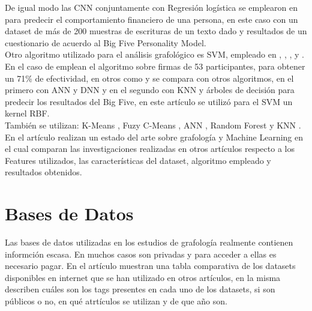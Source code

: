 \documentclass[10pt, a4paper]{article}
\begin{document}
        De igual modo las CNN conjuntamente con Regresi\'on log\'istica se emplearon en \cite{THOMAS2020100315} para predecir el comportamiento financiero de una persona, en este caso con un dataset de más de 200 muestras de escrituras de un texto dado y resultados de un cuestionario de acuerdo al Big Five Personality Model.\\ 

        Otro algoritmo utilizado para el an\'alisis grafol\'ogico es SVM, empleado en \cite{CHITLANGIA2019384}, \cite{shete2019graphologist}, \cite{maliki2020personality}, \cite{hashemi2015graphology} y \cite{kurniawan2023framework}. En el caso de \cite{maliki2020personality} emplean el algoritmo sobre firmas de 53 participantes, para obtener un 71\% de efectividad, 
        en otros como \cite{shete2019graphologist} y \cite{kurniawan2023framework} se compara con otros algoritmos, en el primero con ANN y DNN y en el segundo con KNN y \'arboles de decisi\'on para predecir los resultados del Big Five, en este art\'iculo se utiliz\'o para el SVM un kernel RBF.\\ 

        Tambi\'en se utilizan: K-Means \cite{pathak2020personality}, Fuzy C-Means \cite{pratiwi2016personality}, ANN \cite{lokhande2017analysis,shete2019graphologist,champa2010artificial,pathak2020personality}, Random Forest \cite{likforman2017emothaw, ayzeren2019emotional} y KNN \cite{pathak2020personality,kurniawan2023framework}.\\

        En el art\'iculo \cite{remaida2020handwriting} realizan un estado del arte sobre grafolog\'ia y Machine Learning en el cual comparan las investigaciones realizadas en 
        otros art\'iculos respecto a los Features utilizados, las caracter\'isticas del dataset, algoritmo empleado y resultados obtenidos.

    \section{Bases de Datos}

        Las bases de datos utilizadas en los estudios de grafolog\'ia realmente contienen informci\'on escasa. En muchos casos 
        son privadas y para acceder a ellas es necesario pagar. En el art\'iculo \cite{likforman2017emothaw} muestran una tabla comparativa de los datasets disponibles en 
        internet que se han utilizado en otros art\'iculos, en la misma describen cu\'ales son los tags presentes en cada uno de los datasets, si son p\'ublicos o no, en qu\'e atrt\'iculos se utilizan y 
        de que a\~no son. \\ 
\end{document}
